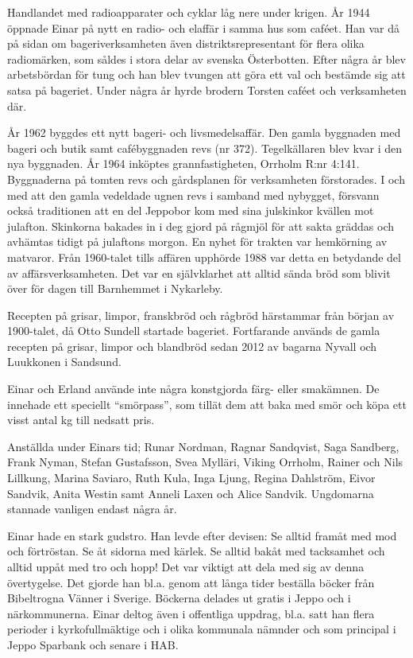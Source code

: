 Handlandet med radioapparater och cyklar låg nere under krigen. År 1944 öppnade Einar på nytt en radio- och elaffär i samma hus som caféet. Han var då på sidan om bageriverksamheten även distriktsrepresentant för flera olika radiomärken, som såldes i stora delar av svenska Österbotten. Efter några år blev arbetsbördan för tung och han blev tvungen att göra ett val och bestämde sig att satsa på bageriet. Under några år hyrde brodern Torsten caféet och verksamheten där.

År 1962 byggdes ett nytt bageri- och livsmedelsaffär. Den gamla byggnaden med bageri och butik samt cafébyggnaden revs (nr 372). Tegelkällaren blev kvar i den nya byggnaden.  År 1964 inköptes grannfastigheten, Orrholm R:nr 4:141. Byggnaderna på tomten revs och gårdsplanen för verksamheten förstorades. I och med att den gamla vedeldade ugnen revs i samband med nybygget, försvann också traditionen att en del Jeppobor kom med sina julskinkor kvällen mot julafton. Skinkorna bakades in i deg gjord på rågmjöl för att sakta gräddas och avhämtas tidigt på julaftons morgon. En nyhet för trakten var hemkörning av matvaror. Från 1960-talet tills affären upphörde 1988 var detta en betydande del av affärsverksamheten. Det var en självklarhet att alltid sända bröd som blivit över för dagen till Barnhemmet i Nykarleby.

Recepten på grisar, limpor, franskbröd och rågbröd härstammar från början av 1900-talet, då Otto Sundell startade bageriet. Fortfarande används de gamla recepten på grisar, limpor och blandbröd sedan 2012 av bagarna Nyvall och Luukkonen i Sandsund.

Einar och Erland använde inte några konstgjorda färg- eller smakämnen. De innehade ett speciellt ``smörpass'', som tillät dem att baka med smör och köpa ett visst antal kg till nedsatt pris.

Anställda under Einars tid; Runar Nordman, Ragnar Sandqvist, Saga Sandberg, Frank Nyman, Stefan Gustafsson, Svea Mylläri, Viking Orrholm, Rainer och Nils Lillkung, Marina Saviaro, Ruth Kula, Inga Ljung, Regina Dahlström, Eivor Sandvik, Anita Westin samt Anneli Laxen och Alice Sandvik.  Ungdomarna stannade vanligen endast några år.

Einar hade en stark gudstro. Han levde efter devisen: Se alltid framåt med mod och förtröstan. Se åt sidorna med kärlek. Se alltid bakåt med tacksamhet och alltid uppåt med tro och hopp! Det var viktigt att dela med sig av denna övertygelse. Det gjorde han bl.a. genom att långa tider beställa böcker från Bibeltrogna Vänner i Sverige. Böckerna delades ut gratis i Jeppo och i närkommunerna. Einar deltog även i offentliga uppdrag, bl.a. satt han flera perioder i kyrkofullmäktige och i olika kommunala nämnder och som principal i Jeppo Sparbank och senare i HAB.

